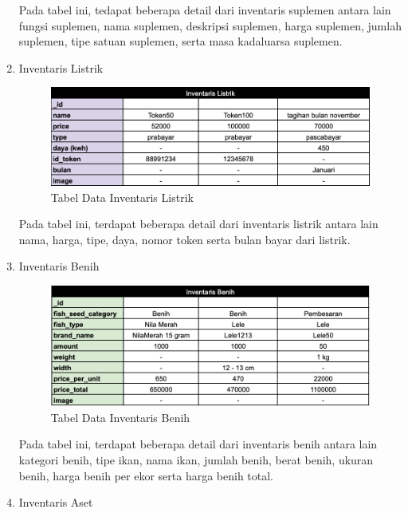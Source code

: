 \begin{spacing}{1.5}
\begin{enumerate}
	Pada tabel ini, tedapat beberapa detail dari inventaris suplemen antara lain fungsi suplemen, nama suplemen, deskripsi suplemen, harga suplemen, jumlah suplemen, tipe satuan suplemen, serta masa kadaluarsa suplemen.

	\item Inventaris Listrik
	
	\begin{figure}[H]
		\centering
		\includegraphics[width=1\textwidth]{gambar/tabel_inventaris_listrik.png}
		\caption{Tabel Data Inventaris Listrik}
	\end{figure}	

	Pada tabel ini, terdapat beberapa detail dari inventaris listrik antara lain nama, harga, tipe, daya, nomor token serta bulan bayar dari listrik.

	\hfill \break
	\hfill \break
	\hfill \break
	\hfill \break

	\item Inventaris Benih
	
	\begin{figure}[H]
		\centering
		\includegraphics[width=1\textwidth]{gambar/tabel_inventaris_benih.png}
		\caption{Tabel Data Inventaris Benih}
	\end{figure}	

	Pada tabel ini, terdapat beberapa detail dari inventaris benih antara lain kategori benih, tipe ikan, nama ikan, jumlah benih, berat benih, ukuran benih, harga benih per ekor serta harga benih total.

	\item Inventaris Aset
	

\end{enumerate}
\end{spacing}
